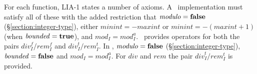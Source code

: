For each function, LIA-1 states a number of axioms.
\ifStd
A \StdErlang\ implementation must satisfy all of these with the added
restriction that $\mathit{modulo}={\bf false}$
(\S\ref{section:integer-type}),
either $\mathit{minint}=-\mathit{maxint}$ or $\mathit{minint}=-(\mathit{maxint}+1)$
(when $\mathit{bounded}={\bf true}$),
 and
$\mathit{mod}_I=\mathit{mod}_I^a$.
\StdErlang\ provides operators for both the pairs $\mathit{div}_I^f/\mathit{rem}_I^f$ and
$\mathit{div}_I^t/\mathit{rem}_I^t$.
\fi
\ifOld
In \OldErlang, $\mathit{modulo}={\bf false}$ (\S\ref{section:integer-type}),
$\mathit{bounded}={\bf false}$ and $\mathit{mod}_I=\mathit{mod}_I^a$.
For $\mathit{div}$ and $\mathit{rem}$ the pair $\mathit{div}_I^t/\mathit{rem}_I^t$ is provided.
\fi

